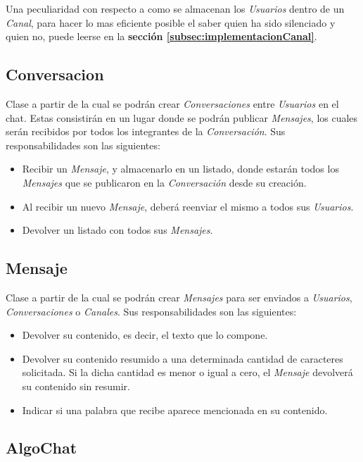 \documentclass[titlepage,a4paper]{article}
\begin{document}
Una peculiaridad con respecto a como se almacenan los \textit{Usuarios} dentro de un \textit{Canal}, para hacer lo mas eficiente posible el saber quien ha sido silenciado y quien no, puede leerse en la \textbf{sección \ref{subsec:implementacionCanal}}.

\subsection{Conversacion}\label{subsec:conversacion}

Clase a partir de la cual se podrán crear \textit{Conversaciones} entre \textit{Usuarios} en el chat. Estas consistirán en un lugar donde se podrán publicar \textit{Mensajes}, los cuales serán recibidos por todos los integrantes de la \textit{Conversación}. Sus responsabilidades son las siguientes:

\begin{itemize}
	\item Recibir un \textit{Mensaje}, y almacenarlo en un listado, donde estarán todos los \textit{Mensajes} que se publicaron en la \textit{Conversación} desde su creación.
	\item Al recibir un nuevo \textit{Mensaje}, deberá reenviar el mismo a todos sus \textit{Usuarios}.
	\item Devolver un listado con todos sus \textit{Mensajes}.
\end{itemize}

\subsection{Mensaje}\label{subsec:mensaje}

Clase a partir de la cual se podrán crear \textit{Mensajes} para ser enviados a \textit{Usuarios}, \textit{Conversaciones} o \textit{Canales}. Sus responsabilidades son las siguientes:

\begin{itemize}
	\item Devolver su contenido, es decir, el texto que lo compone.
	\item Devolver su contenido resumido a una determinada cantidad de caracteres solicitada. Si la dicha cantidad es menor o igual a cero, el \textit{Mensaje} devolverá su contenido sin resumir.
	\item Indicar si una palabra que recibe aparece mencionada en su contenido.
\end{itemize}

\subsection{AlgoChat}\label{subsec:algochat}
\end{document}
